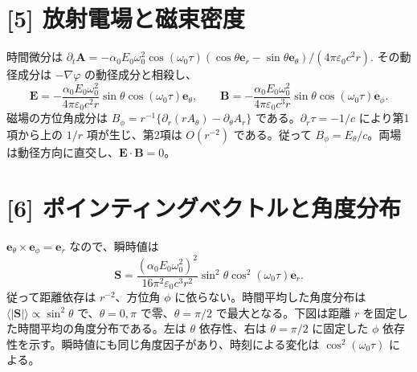 \documentclass[11pt,a4paper]{article}
\begin{document}
\section*{[5] 放射電場と磁束密度}
時間微分は $\partial_t\boldsymbol A=-\alpha_0E_0\omega_0^2\cos(\omega_0\tau)(\cos\theta\boldsymbol e_r-\sin\theta\boldsymbol e_\theta)/(4\pi\varepsilon_0c^2r)$. その動径成分は $-\nabla\varphi$ の動径成分と相殺し、
\[
\boxed{\boldsymbol E=-\frac{\alpha_0E_0\omega_0^2}{4\pi\varepsilon_0c^2r}
\sin\theta\cos(\omega_0\tau)\boldsymbol e_\theta},\qquad
\boxed{\boldsymbol B=-\frac{\alpha_0E_0\omega_0^2}{4\pi\varepsilon_0c^3r}
\sin\theta\cos(\omega_0\tau)\boldsymbol e_\phi}.
\]
磁場の方位角成分は $B_\phi=r^{-1}\{\partial_r(rA_\theta)-\partial_\theta A_r\}$ である。$\partial_r\tau=-1/c$ により第1項から上の $1/r$ 項が生じ、第2項は $O(r^{-2})$ である。従って $B_\phi=E_\theta/c$。両場は動径方向に直交し、$\boldsymbol E\cdot\boldsymbol B=0$。

\section*{[6] ポインティングベクトルと角度分布}
$\boldsymbol e_\theta\times\boldsymbol e_\phi=\boldsymbol e_r$ なので、瞬時値は
\[
\boxed{\boldsymbol S=\frac{(\alpha_0E_0\omega_0^2)^2}{16\pi^2\varepsilon_0c^3r^2}
\sin^2\theta\cos^2(\omega_0\tau)\boldsymbol e_r}.
\]
従って距離依存は $r^{-2}$、方位角 $\phi$ に依らない。時間平均した角度分布は $\langle|\boldsymbol S|\rangle\propto\sin^2\theta$ で、$\theta=0,\pi$ で零、$\theta=\pi/2$ で最大となる。下図は距離 $r$ を固定した時間平均の角度分布である。左は $\theta$ 依存性、右は $\theta=\pi/2$ に固定した $\phi$ 依存性を示す。瞬時値にも同じ角度因子があり、時刻による変化は $\cos^2(\omega_0\tau)$ による。
\begin{center}
\hspace{0.8cm}
\end{center}
\end{document}
